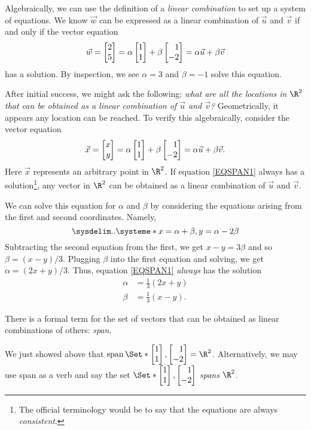 Algebraically, we can use the definition of a \emph{linear combination} to set up a system of equations.
We know $\vec w$ can be expressed as a linear combination of $\vec u$ and $\vec v$ if and only if 
the vector equation
\[
	\vec w = \mat{2\\5}=\alpha\mat{1\\1}+\beta\mat{1\\-2}=\alpha \vec u+\beta \vec v
\]
has a solution. By inspection, we see $\alpha=3$ and $\beta=-1$ solve this equation.

After initial success, we might ask the following:
\emph{what are all the locations in $\R^2$ that can be obtained
as a linear combination of $\vec u$ and $\vec v$?} Geometrically, it appears
any location can be reached. To verify this algebraically, consider the vector equation
\begin{equation}
	\label{EQSPAN1}
	\vec x=\mat{x\\y} = \alpha\mat{1\\1}+\beta\mat{1\\-2} = \alpha\vec u+\beta\vec v.
\end{equation}
Here $\vec x$ represents an arbitrary point in $\R^2$. If equation \eqref{EQSPAN1} always
has a solution\footnote{ The official terminology would be to say that
the equations are always \emph{consistent}.}, any vector in $\R^2$ can be obtained as a linear combination of $\vec u$ and $\vec v$.

We can solve this equation for $\alpha$ and $\beta$ by considering the equations arising from the
first and second coordinates. Namely,
	\[
		\sysdelim..\systeme*{x=\alpha+\beta, y=\alpha-2\beta}
	\]
Subtracting the second equation from the first, we get $x-y=3\beta$ and so $\beta=(x-y)/3$. Plugging 
$\beta$ into the first equation and solving, we get $\alpha=(2x+y)/3$. Thus, equation \eqref{EQSPAN1}
\emph{always} has the solution
\begin{align*}
	\alpha &= \tfrac{1}{3}(2x+y)\\
	\beta &= \tfrac{1}{3}(x-y).
\end{align*}

There is a formal term for the set of vectors that can be obtained as linear combinations
of others: \emph{span}.


We just showed above that $\Span\Set*{\mat{1\\1},\mat{1\\-2}}=\R^2$. Alternatively, we may use span as a verb and say 
the set $\Set*{\mat{1\\1},\mat{1\\-2}}$ \emph{spans} $\R^2$.

